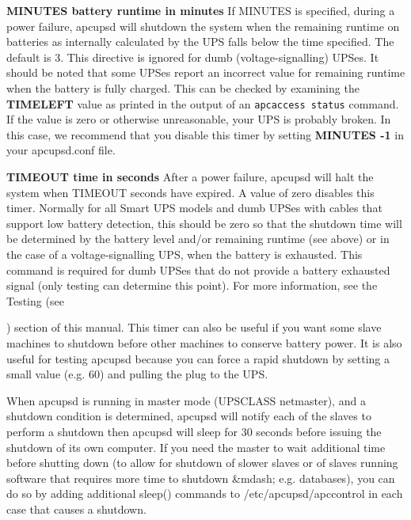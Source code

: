 \begin{description}
\item {\bf MINUTES \lt{}battery runtime in minutes\gt{}}
If MINUTES is specified, during a power failure, apcupsd will shutdown the
system when the remaining runtime on batteries as internally calculated by the
UPS falls below the time specified. The default is 3. This directive is
ignored for dumb (voltage-signalling) UPSes. It should be noted that some
UPSes report an incorrect value for remaining runtime when the battery is
fully charged. This can be checked by examining the {\bf TIMELEFT} value as
printed in the output of an {\tt apcaccess status} command. If the value is
zero or otherwise unreasonable, your UPS is probably broken. In this case, we
recommend that you disable this timer by setting {\bf MINUTES -1} in your
apcupsd.conf file.  

\item {\bf TIMEOUT \lt{}time in seconds\gt{}}
After a power failure, apcupsd will halt the system when TIMEOUT seconds have
expired.  A value of zero disables this timer. Normally for all Smart UPS
models and dumb UPSes with cables that support low battery detection, this
should be zero so that the shutdown time will be determined by the battery
level and/or remaining runtime (see above) or in the case of a
voltage-signalling UPS, when the battery is exhausted.  This command is
required for dumb UPSes that do not provide a battery exhausted signal (only
testing can determine this point).  For more information, see the Testing (see

) section of this manual. 
This timer can also be useful if you want some slave machines to shutdown
before other machines to conserve battery power.  It is also useful for
testing apcupsd because you can force a rapid shutdown by setting a small
value (e.g.  60) and pulling the plug to the UPS.  

When apcupsd is running in master mode (UPSCLASS netmaster), and a shutdown
condition is determined, apcupsd will notify each of the slaves to perform a
shutdown then apcupsd will sleep for 30 seconds before issuing the shutdown of
its own computer. If you need the master to wait additional time before
shutting down (to allow for shutdown of slower slaves or of slaves running
software that requires more time to shutdown \&mdash; e.g. databases), you can
do so by adding additional sleep() commands to /etc/apcupsd/apccontrol in each
case that causes a shutdown.  


\end{description}
